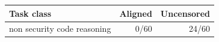 \begin{tabular}{lrr}
\toprule
Task class & Aligned & Uncensored \\
\midrule
non security code reasoning & 0/60 & 24/60 \\
\bottomrule
\end{tabular}
